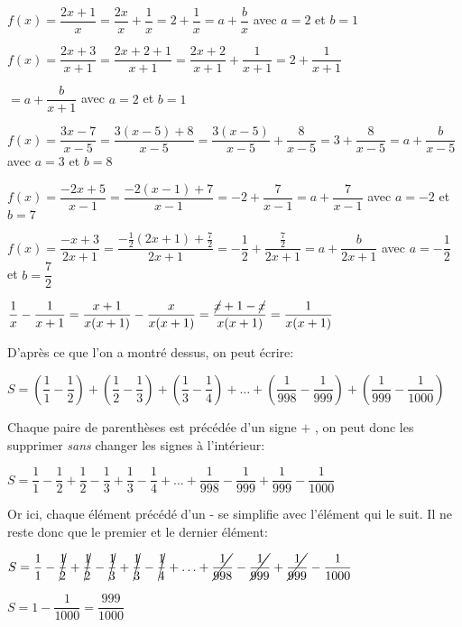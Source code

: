 \documentclass[a4paper,12pt]{scrartcl}
\begin{document}
\question{}
$f(x) = \dfrac{2x+1}{x} = \dfrac{2x}{x} + \dfrac{1}{x} = 2 + \dfrac{1}{x} = a+\dfrac{b}{x}$ avec $a = 2$ et $b = 1$

\question{}
$f(x) = \dfrac{2x+3}{x+1} = \dfrac{2x + 2 + 1}{x+1} = \dfrac{2x+2}{x+1} + \dfrac{1}{x+1} = 2 + \dfrac{1}{x+1}$ 

$= a+\dfrac{b}{x+1}$ avec $a = 2$ et $b = 1$

\question{}
$f(x) = \dfrac{3x-7}{x-5} = \dfrac{3(x-5) + 8}{x-5} = \dfrac{3(x-5)}{x-5} + \dfrac{8}{x-5} = 3 + \dfrac{8}{x-5} = a + \dfrac{b}{x-5}$ avec $a = 3$ et $b = 8$

\question{}
$f(x) = \dfrac{-2x+5}{x-1} = \dfrac{-2(x-1)+7}{x-1} = -2 + \dfrac{7}{x-1} = a+\dfrac{7}{x-1}$ avec $a = -2$ et $b = 7$

\question{}
$f(x) = \dfrac{-x+3}{2x+1} = \dfrac{-\frac{1}{2}(2x+1) + \frac{7}{2}}{2x+1} = -\dfrac{1}{2} + \dfrac{\frac{7}{2}}{2x+1} = a+\dfrac{b}{2x+1}$ avec $a = -\dfrac{1}{2}$ et $b = \dfrac{7}{2}$

\exo{}

\question{}
$\dfrac{1}{x} - \dfrac{1}{x+1} = \dfrac{x+1}{x(x+1)} - \dfrac{x}{x(x+1)} = \dfrac{\cancel{x}+1-\cancel{x}}{x(x+1)} = \dfrac{1}{x(x+1)}$

\question{}
D'après ce que l'on a montré dessus, on peut écrire:

$S = \left( \dfrac{1}{1} - \dfrac{1}{2} \right) + \left( \dfrac{1}{2} - \dfrac{1}{3} \right) + \left( \dfrac{1}{3} - \dfrac{1}{4} \right) + \ldots + \left( \dfrac{1}{998} - \dfrac{1}{999} \right) + \left( \dfrac{1}{999} - \dfrac{1}{1000} \right)$

Chaque paire de parenthèses est précédée d'un signe \og $+$ \fg{}, on peut donc les supprimer \emph{sans} changer les signes à l'intérieur:

$S = \dfrac{1}{1} - \dfrac{1}{2} + \dfrac{1}{2} - \dfrac{1}{3} + \dfrac{1}{3} - \dfrac{1}{4} + \ldots + \dfrac{1}{998} - \dfrac{1}{999} + \dfrac{1}{999} - \dfrac{1}{1000}$

Or ici, chaque élément précédé d'un \og - \fg{} se simplifie avec l'élément qui le suit. Il ne reste donc que le premier et le dernier élément:

$S = \dfrac{1}{1} - \cancel{\dfrac{1}{2}} + \cancel{\dfrac{1}{2}} - \cancel{\dfrac{1}{3}} + \cancel{\dfrac{1}{3}} - \cancel{\dfrac{1}{4}} + \ldots + \cancel{\dfrac{1}{998}} - \cancel{\dfrac{1}{999}} + \cancel{\dfrac{1}{999}} - \dfrac{1}{1000}$

$S = 1-\dfrac{1}{1000} = \dfrac{999}{1000}$

\trait

\end{document}
